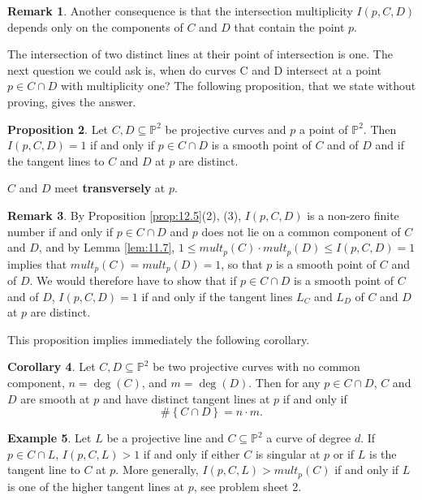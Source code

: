 \documentclass{article}
\renewcommand{\P}{\mathbb{P}}
\newcommand{\rb}[1]{\left( #1 \right)}
\newcommand{\cb}[1]{\left\{ #1 \right\}}
\theoremstyle{definition}\newtheorem{definition}{Definition}[section]
\theoremstyle{definition}\newtheorem{notation}[definition]{Notation}
\theoremstyle{definition}\newtheorem{remark}[definition]{Remark}
\theoremstyle{definition}\newtheorem{example}[definition]{Example}
\theoremstyle{definition}\newtheorem{fact}{Fact}
\theoremstyle{definition}\newtheorem{exercise}{Exercise}
\newtheorem{proposition}[definition]{Proposition}
\newtheorem{corollary}[definition]{Corollary}
\begin{document}
\begin{remark}
Another consequence is that the intersection multiplicity $ I\rb{p, C, D} $ depends only on the components of $ C $ and $ D $ that contain the point $ p $.
\end{remark}

The intersection of two distinct lines at their point of intersection is one. The next question we could ask is, when do curves C and D intersect at a point $ p \in C \cap D $ with multiplicity one? The following proposition, that we state without proving, gives the answer.

\begin{proposition}
\label{prop:12.11}
Let $ C, D \subseteq \P^2 $ be projective curves and $ p $ a point of $ \P^2 $. Then $ I\rb{p, C, D} = 1 $ if and only if $ p \in C \cap D $ is a smooth point of $ C $ and of $ D $ and if the tangent lines to $ C $ and $ D $ at $ p $ are distinct.
\end{proposition}

$ C $ and $ D $ meet \textbf{transversely} at $ p $.

\begin{remark}
By Proposition \ref{prop:12.5}(2), (3), $ I\rb{p, C, D} $ is a non-zero finite number if and only if $ p \in C \cap D $ and $ p $ does not lie on a common component of $ C $ and $ D $, and by Lemma \ref{lem:11.7}, $ 1 \le mult_p\rb{C} \cdot mult_p\rb{D} \le I\rb{p, C, D} = 1 $ implies that $ mult_p\rb{C} = mult_p\rb{D} = 1 $, so that $ p $ is a smooth point of $ C $ and of $ D $. We would therefore have to show that if $ p \in C \cap D $ is a smooth point of $ C $ and of $ D $, $ I\rb{p, C, D} = 1 $ if and only if the tangent lines $ L_C $ and $ L_D $ of $ C $ and $ D $ at $ p $ are distinct.
\end{remark}

This proposition implies immediately the following corollary.

\begin{corollary}
Let $ C, D \subseteq \P^2 $ be two projective curves with no common component, $ n = \deg\rb{C} $, and $ m = \deg\rb{D} $. Then for any $ p \in C \cap D $, $ C $ and $ D $ are smooth at $ p $ and have distinct tangent lines at $ p $ if and only if
$$ \#\cb{C \cap D} = n \cdot m. $$
\end{corollary}

\begin{example}
Let $ L $ be a projective line and $ C \subseteq \P^2 $ a curve of degree $ d $. If $ p \in C \cap L $, $ I\rb{p, C, L} > 1 $ if and only if either $ C $ is singular at $ p $ or if $ L $ is the tangent line to $ C $ at $ p $. More generally, $ I\rb{p, C, L} > mult_p\rb{C} $ if and only if $ L $ is one of the higher tangent lines at $ p $, see problem sheet 2.
\end{example}
\end{document}
